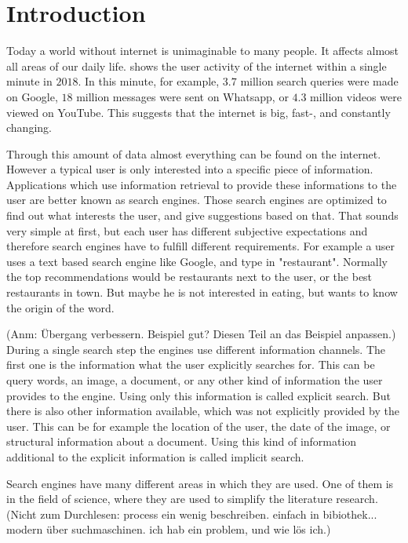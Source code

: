\chapter{Introduction}
\label{cha:introduction}

Today a world without internet is unimaginable to many people. It affects almost all areas of our daily life.  shows the user activity of the internet within a single minute in $2018$. In this minute, for example, $3.7$ million search queries were made on Google, $18$ million messages were sent on Whatsapp, or $4.3$ million videos were viewed on YouTube. This suggests that the internet is big, fast-, and constantly changing.

Through this amount of data almost everything can be found on the internet. However a typical user is only interested into a specific piece of information. Applications which use information retrieval to provide these informations to the user are better known as search engines. Those search engines are optimized to find out what interests the user, and give suggestions based on that. That sounds very simple at first, but each user has different subjective expectations and therefore search engines have to fulfill different requirements. For example a user uses a text based search engine like Google, and type in "restaurant". Normally the top recommendations would be restaurants next to the user, or the best restaurants in town. But maybe he is not interested in eating, but wants to know the origin of the word. %

(Anm: Übergang verbessern. Beispiel gut? Diesen Teil an das Beispiel anpassen.) During a single search step the engines use different information channels. The first one is the information what the user explicitly searches for. This can be query words, an image, a document, or any other kind of information the user provides to the engine. Using only this information is called explicit search. But there is also other information available, which was not explicitly provided by the user. This can be for example the location of the user, the date of the image, or structural information about a document. Using this kind of information additional to the explicit information is called implicit search. %

Search engines have many different areas in which they are used. One of them is in the field of science, where they are used to simplify the literature research. (Nicht zum Durchlesen: process ein wenig beschreiben. einfach in bibiothek... modern über suchmaschinen. ich hab ein problem, und wie lös ich.)


